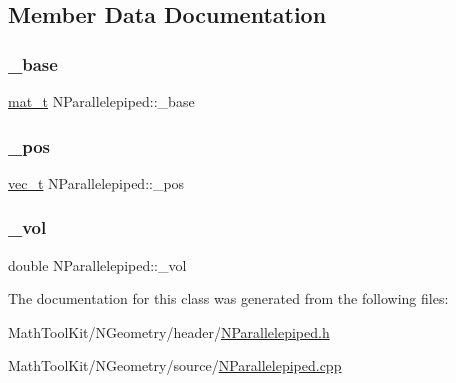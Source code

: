\subsection{Member Data Documentation}
\mbox{\label{class_n_parallelepiped_a02542ae7d5e1d052412eb06a292e0e9d}} 
\subsubsection{\texorpdfstring{\_base}{\_base}}
{\footnotesize\ttfamily \mbox{\hyperlink{_n_p_matrix_8h_a44dfb60c1e03b44e98a332fb2ae71947}{mat\+\_\+t}} N\+Parallelepiped\+::\+\_\+base\hspace{0.3cm}{\ttfamily [protected]}}

\mbox{\label{class_n_parallelepiped_ae1cc22beb853095d8a110c641dd8e005}} 
\subsubsection{\texorpdfstring{\_pos}{\_pos}}
{\footnotesize\ttfamily \mbox{\hyperlink{group___n_algebra_ga0a2cfc67e738a3d73e4f12098c4c07f6}{vec\+\_\+t}} N\+Parallelepiped\+::\+\_\+pos\hspace{0.3cm}{\ttfamily [protected]}}

\mbox{\label{class_n_parallelepiped_aabd33c4ffeff864ea342440c08d4702b}} 
\subsubsection{\texorpdfstring{\_vol}{\_vol}}
{\footnotesize\ttfamily double N\+Parallelepiped\+::\+\_\+vol\hspace{0.3cm}{\ttfamily [protected]}}



The documentation for this class was generated from the following files\+:\begin{DoxyCompactItemize}
\item 
Math\+Tool\+Kit/\+N\+Geometry/header/\mbox{\hyperlink{_n_parallelepiped_8h}{N\+Parallelepiped.\+h}}\item 
Math\+Tool\+Kit/\+N\+Geometry/source/\mbox{\hyperlink{_n_parallelepiped_8cpp}{N\+Parallelepiped.\+cpp}}\end{DoxyCompactItemize}
